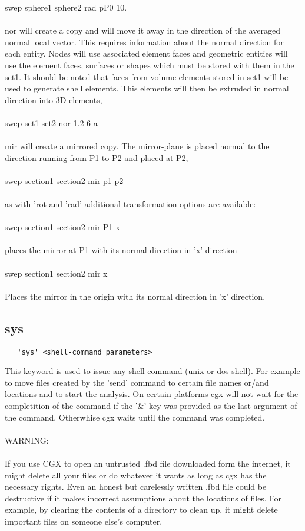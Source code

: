 \documentclass{article}
\begin{document}
swep sphere1 sphere2 rad pP0 10.\\\\
nor will create a copy and will move it away in the direction of the averaged normal local vector. This requires information about the normal direction for each entity. Nodes will use associated element faces and geometric entities will use the element faces, surfaces or shapes which must be stored with them in the set1. It should be noted that faces from volume elements stored in set1 will be used to generate shell elements. This elements will then be extruded in normal direction into 3D elements,\\\\
swep set1 set2 nor 1.2 6 a\\\\
mir will create a mirrored copy. The mirror-plane is placed normal to the direction running from P1 to P2 and placed at P2,\\\\
swep section1 section2 mir p1 p2\\\\
as with 'rot and 'rad' additional transformation options are available:\\\\
swep section1 section2 mir P1 x\\\\
places the mirror at P1 with its normal direction in 'x' direction\\\\
swep section1 section2 mir x\\\\
Places the mirror in the origin with its normal direction in 'x' direction.

\subsection{\label{sys}sys}
\begin{verbatim}
   'sys' <shell-command parameters>
\end{verbatim}
This keyword is used to issue any shell command (unix or dos shell). For example to move files created by the 'send' command to certain file names or/and locations and to start the analysis. On certain platforms cgx will not wait for the completition of the command if the '\&' key was provided as the last argument of the command. Otherwhise cgx waits until the command was completed.\\\\
WARNING:\\\\ 
If you use CGX to open an untrusted .fbd file downloaded form the internet, it might delete all your files or do whatever it wants as long as cgx has the necessary rights.
Even an honest  but carelessly written .fbd file could be destructive if it makes incorrect assumptions about the locations of files. For example, by clearing the contents of a directory to clean up, it might delete important files on someone else's computer.
\end{document}

